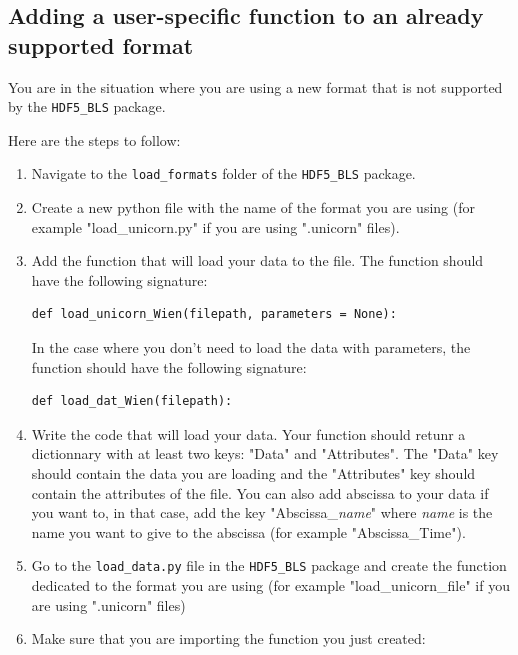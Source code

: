 \documentclass[a4paper,12pt]{article}
\begin{document}
    \subsection{Adding a user-specific function to an already supported format} \label{subsec:load_data.new_format}

        \begin{tcolorbox}
            You are in the situation where you are using a new format that is not supported by the \texttt{HDF5\_BLS} package.
        \end{tcolorbox}

        Here are the steps to follow:
        \begin{enumerate}
            \item Navigate to the \texttt{load\_formats} folder of the \texttt{HDF5\_BLS} package. 
            \item Create a new python file with the name of the format you are using (for example "load\_unicorn.py" if you are using ".unicorn" files).
            \item Add the function that will load your data to the file. The function should have the following signature:
\begin{lstlisting}
def load_unicorn_Wien(filepath, parameters = None):
\end{lstlisting}
            In the case where you don't need to load the data with parameters, the function should have the following signature:
\begin{lstlisting}
def load_dat_Wien(filepath):
\end{lstlisting}
            \item Write the code that will load your data. Your function should retunr a dictionnary with at least two keys: "Data" and "Attributes". The "Data" key should contain the data you are loading and the "Attributes" key should contain the attributes of the file. You can also add abscissa to your data if you want to, in that case, add the key "Abscissa\_\textsl{name}" where \textsl{name} is the name you want to give to the abscissa (for example "Abscissa\_Time").
            \item Go to the \texttt{load\_data.py} file in the \texttt{HDF5\_BLS} package and create the function dedicated to the format you are using (for example "load\_unicorn\_file" if you are using ".unicorn" files)
            \item Make sure that you are importing the function you just created:
\begin{lstlisting}

\end{lstlisting}
\end{enumerate}
\end{document}
